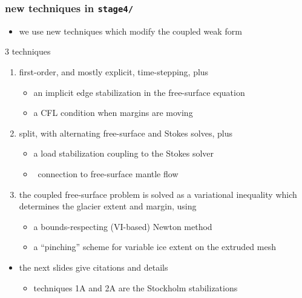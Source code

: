 \documentclass[10pt,
               hyperref={colorlinks,citecolor=DeepPink4,linkcolor=black,urlcolor=blue},
               svgnames]{beamer}
\newcommand{\detailgo}[1]{\smallskip \hspace{-4mm} \hyperlink{#1}{\beamergotobutton{details}} \,}
\begin{document}
\begin{frame}[label=newtech]
\frametitle{new techniques in \texttt{stage4/}}

\begin{itemize}
\item we use \alert{new techniques} which modify the coupled weak form
\end{itemize}

\begin{block}{3 techniques}
\begin{enumerate}
\item[1.] first-order, and mostly explicit, time-stepping, plus
        \begin{itemize}
        \item[A.] an implicit \alert{edge stabilization} in the free-surface equation
        \item[B.] a CFL condition when margins are moving
        \end{itemize}

\item[2.] split, with alternating free-surface and Stokes solves, plus
        \begin{itemize}
        \item[A.] a \alert{load stabilization} coupling to the Stokes solver
        \item[] \detailgo{mantle} connection to free-surface mantle flow
        \end{itemize}

\item[3.] the coupled free-surface problem is solved as a \alert{variational inequality} which determines the glacier extent and margin, using
        \begin{itemize}
        \item[A.] a bounds-respecting (VI-based) Newton method
        \item[B.] a ``pinching'' scheme for variable ice extent on the extruded mesh
        \end{itemize}
\end{enumerate}
\end{block}

\begin{itemize}
\item the next slides give citations and details
    \begin{itemize}
    \item[$\circ$] techniques 1A and 2A are the \alert{Stockholm stabilizations}
    \end{itemize}
\end{itemize}

\end{frame}
\end{document}
